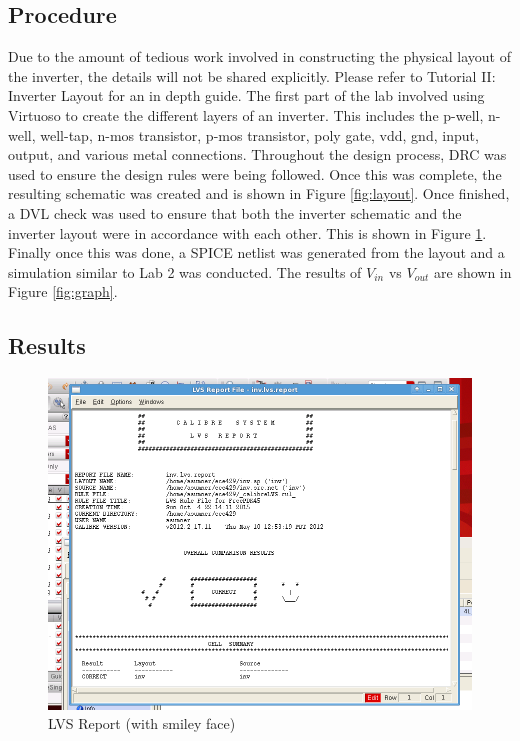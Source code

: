 \documentclass[12pt]{article}
\begin{document}
\subsection{Procedure}
Due to the amount of tedious work involved in constructing the physical layout of the inverter, the details will not be shared explicitly. Please refer to Tutorial II: Inverter Layout for an in depth guide. The first part of the lab involved using Virtuoso to create the different layers of an inverter. This includes the p-well, n-well, well-tap, n-mos transistor, p-mos transistor, poly gate, vdd, gnd, input, output, and various metal connections. Throughout the design process, DRC was used to ensure the design rules were being followed. Once this was complete, the resulting schematic was created and is shown in Figure \ref{fig:layout}. Once finished, a DVL check was used to ensure that both the inverter schematic and the inverter layout were in accordance with each other. This is shown in Figure \ref{fig:lvs}. Finally once this was done, a SPICE netlist was generated from the layout and a simulation similar to Lab 2 was conducted. The results of $V_{in}$ vs $V_{out}$ are shown in Figure \ref{fig:graph}. 
\subsection{Results}
\begin{figure}[H]
\centering
\includegraphics[width=1\linewidth]{lvs}
\caption{LVS Report (with smiley face)}
\label{fig:lvs}
\end{figure}
\end{document}
